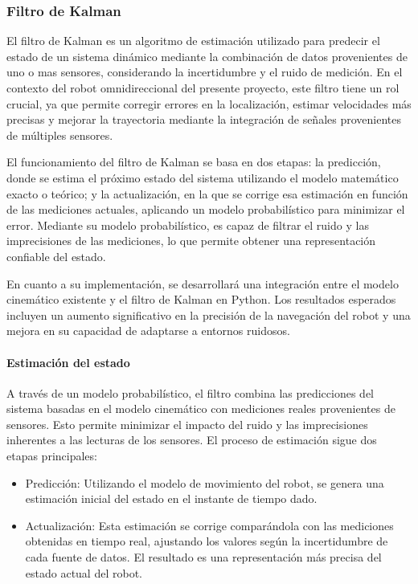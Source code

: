 \subsubsection{Filtro de Kalman}

El filtro de Kalman es un algoritmo de estimación utilizado para predecir el estado de un sistema dinámico mediante la combinación de datos provenientes de uno o mas sensores, considerando la incertidumbre y el ruido de medición. En el contexto del robot omnidireccional del presente proyecto, este filtro tiene un rol crucial, ya que permite corregir errores en la localización, estimar velocidades más precisas y mejorar la trayectoria mediante la integración de señales provenientes de múltiples sensores.

El funcionamiento del filtro de Kalman se basa en dos etapas: la predicción, donde se estima el próximo estado del sistema utilizando el modelo matemático exacto o teórico; y la actualización, en la que se corrige esa estimación en función de las mediciones actuales, aplicando un modelo probabilístico para minimizar el error. Mediante su modelo probabilístico, es capaz de filtrar el ruido y las imprecisiones de las mediciones, lo que permite obtener una representación confiable del estado.

En cuanto a su implementación, se desarrollará una integración entre el modelo cinemático existente y el filtro de Kalman en Python. Los resultados esperados incluyen un aumento significativo en la precisión de la navegación del robot y una mejora en su capacidad de adaptarse a entornos ruidosos. \cite{negenborn2003robot}


\paragraph{Estimación del estado} \mbox{} \vspace{8pt}

A través de un modelo probabilístico, el filtro combina las predicciones del sistema basadas en el modelo cinemático con mediciones reales provenientes de sensores. Esto permite minimizar el impacto del ruido y las imprecisiones inherentes a las lecturas de los sensores. El proceso de estimación sigue dos etapas principales:

\begin{itemize}
    \item Predicción: Utilizando el modelo de movimiento del robot, se genera una estimación inicial del estado en el instante de tiempo dado.
    \item Actualización: Esta estimación se corrige comparándola con las mediciones obtenidas en tiempo real, ajustando los valores según la incertidumbre de cada fuente de datos. El resultado es una representación más precisa del estado actual del robot.
\end{itemize}

